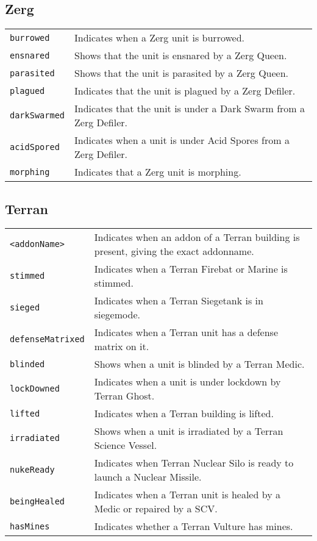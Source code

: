 \subsection{Zerg}
\begin{tabularx}{\textwidth}{lX}
 \verb|burrowed| & Indicates when a Zerg unit is burrowed. \\
 \verb|ensnared| & Shows that the unit is ensnared by a Zerg Queen. \\
 \verb|parasited| & Shows that the unit is parasited by a Zerg Queen. \\
 \verb|plagued| & Indicates that the unit is plagued by a Zerg Defiler. \\
 \verb|darkSwarmed| & Indicates that the unit is under a Dark Swarm from a Zerg Defiler. \\
 \verb|acidSpored | & Indicates when a unit is under Acid Spores from a Zerg Defiler. \\
 \verb|morphing| & Indicates that a Zerg unit is morphing.
\end{tabularx}

\subsection{Terran}
\begin{tabularx}{\textwidth}{lX}
 \verb|<addonName>| & Indicates when an addon of a Terran building is present, giving the exact addonname.\\
 \verb|stimmed| & Indicates when a Terran Firebat or Marine is stimmed.\\
 \verb|sieged| & Indicates when a Terran Siegetank is in siegemode.\\
 \verb|defenseMatrixed| & Indicates when a Terran unit has a defense matrix on it.\\
 \verb|blinded| & Shows when a unit is blinded by a Terran Medic. \\
 \verb|lockDowned| & Indicates when a unit is under lockdown by Terran Ghost. \\
 \verb|lifted| & Indicates when a Terran building is lifted. \\
 \verb|irradiated| & Shows when a unit is irradiated by a Terran Science Vessel. \\
 \verb|nukeReady| & Indicates when Terran Nuclear Silo is ready to launch a Nuclear Missile. \\
 \verb|beingHealed| & Indicates when a Terran unit is healed by a Medic or repaired by a SCV. \\
 \verb|hasMines| & Indicates whether a Terran Vulture has mines.
\end{tabularx}

